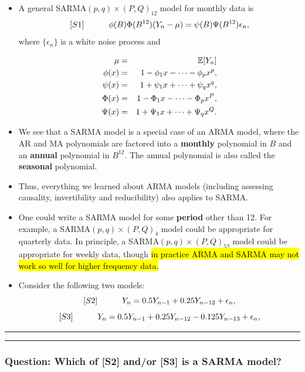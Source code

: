 \documentclass[]{article}
\begin{document}
\begin{itemize}
\item
  A general SARMA\((p,q)\times(P,Q)_{12}\) model for monthly data is
  \[[S1] \quad\quad\quad \phi(B)\Phi(B^{12}) (Y_n-\mu) = \psi(B)\Psi(B^{12}) \epsilon_n,\]
  where \(\{\epsilon_n\}\) is a white noise process and

  \begin{eqnarray}
  \mu &=& \mathbb{E}[Y_n]
  \\
  \phi(x)&=&1-\phi_1 x-\dots -\phi_px^p,
  \\ 
  \psi(x)&=&1+\psi_1 x+\dots +\psi_qx^q, 
  \\
  \Phi(x)&=&1-\Phi_1 x-\dots -\Phi_px^P,
  \\ 
  \Psi(x)&=&1+\Psi_1 x+\dots +\Psi_qx^Q.
  \end{eqnarray}
\item
  We see that a SARMA model is a special case of an ARMA model, where
  the AR and MA polynomials are factored into a \textbf{monthly}
  polynomial in \(B\) and an \textbf{annual} polynomial in \(B^{12}\).
  The annual polynomial is also called the \textbf{seasonal} polynomial.
\item
  Thus, everything we learned about ARMA models (including assessing
  causality, invertibility and reducibility) also applies to SARMA.
\item
  One could write a SARMA model for some \textbf{period} other than 12.
  For example, a SARMA\((p,q)\times(P,Q)_{4}\) model could be
  appropriate for quarterly data. In principle, a
  SARMA\((p,q)\times(P,Q)_{52}\) model could be appropriate for weekly
  data, though \hl{in practice ARMA and SARMA may not work so well for
  higher frequency data.}
\item
  Consider the following two models:
  \[[S2] \quad\quad\quad Y_n = 0.5 Y_{n-1} + 0.25 Y_{n-12} + \epsilon_n,\]
  \[[S3] \quad\quad\quad Y_n = 0.5 Y_{n-1} + 0.25 Y_{n-12} - 0.125 Y_{n-13} + \epsilon_n,\]
\end{itemize}

\begin{center}\rule{0.5\linewidth}{\linethickness}\end{center}

\begin{center}\rule{0.5\linewidth}{\linethickness}\end{center}

\subsubsection{Question: Which of {[}S2{]} and/or {[}S3{]} is a SARMA
model?}\label{question-which-of-s2-andor-s3-is-a-sarma-model}
\end{document}
